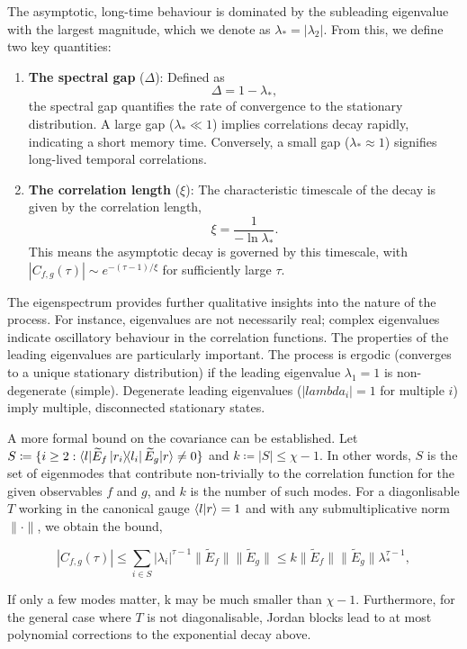 The asymptotic, long-time behaviour is dominated by the subleading eigenvalue with the largest magnitude, which we denote as \(\lambda_* = |\lambda_2|\). From this, we define two key quantities:
\begin{enumerate}
    \item \textbf{The spectral gap} (\(\Delta\)): Defined as 
    \begin{equation}
        \Delta = 1 - \lambda_*,
    \end{equation}
    the spectral gap quantifies the rate of convergence to the stationary distribution. A large gap (\(\lambda_* \ll 1\)) implies correlations decay rapidly, indicating a short memory time. Conversely, a small gap (\(\lambda_* \approx 1\)) signifies long-lived temporal correlations.
    \item \textbf{The correlation length} (\(\xi\)): The characteristic timescale of the decay is given by the correlation length,
    \begin{equation}
        \xi = \frac{1}{-\ln \lambda_*}.
    \end{equation}
    This means the asymptotic decay is governed by this timescale, with \(|C_{f,g}(\tau)| \sim e^{-(\tau - 1)/\xi}\) for sufficiently large \(\tau\).
\end{enumerate}
The eigenspectrum provides further qualitative insights into the nature of the process. For instance, eigenvalues are not necessarily real; complex eigenvalues indicate oscillatory behaviour in the correlation functions. The properties of the leading eigenvalues are particularly important. The process is ergodic (converges to a unique stationary distribution) if the leading eigenvalue \(\lambda_1 = 1\) is non-degenerate (simple). Degenerate leading eigenvalues (\(|lambda_i| = 1\) for multiple \(i\)) imply multiple, disconnected stationary states.

A more formal bound on the covariance can be established. Let \(S \coloneq \{i \geq 2: \braket{l|\widetilde{E}_f \ket{r_i}\!\!\bra{l_i} \widetilde{E}_g|r} \neq 0\}\) and \(k \coloneq |S| \leq \chi - 1\). In other words, \(S\) is the set of eigenmodes that contribute non-trivially to the correlation function for the given observables \(f\) and \(g\), and \(k\) is the number of such modes. For a diagonlisable \(T\) working in the canonical gauge \(\braket{l|r} = 1\) and with any submultiplicative norm \(\|\cdot\|\), we obtain the bound,
\begin{proposition}
    \begin{equation}
    |C_{f,g}(\tau)| \leq \sum_{i\in S} |\lambda_i|^{\tau - 1} \| \widetilde{E}_f \| \| \widetilde{E}_g \| \leq k\|\widetilde{E}_f \| \| \widetilde{E}_g \| \lambda_*^{\tau - 1},
    \end{equation}
\end{proposition}
If only a few modes matter, k may be much smaller than \(\chi - 1\). Furthermore, for the general case where \(T\) is not diagonalisable, Jordan blocks lead to at most polynomial corrections to the exponential decay above.


